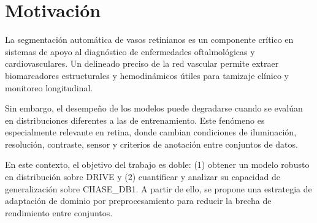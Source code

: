 \section{Motivación}
La segmentación automática de vasos retinianos es un componente crítico en sistemas de apoyo al diagnóstico de enfermedades oftalmológicas y cardiovasculares. Un delineado preciso de la red vascular permite extraer biomarcadores estructurales y hemodinámicos útiles para tamizaje clínico y monitoreo longitudinal.

Sin embargo, el desempeño de los modelos puede degradarse cuando se evalúan en distribuciones diferentes a las de entrenamiento. Este fenómeno es especialmente relevante en retina, donde cambian condiciones de iluminación, resolución, contraste, sensor y criterios de anotación entre conjuntos de datos.

En este contexto, el objetivo del trabajo es doble: (1) obtener un modelo robusto en distribución sobre DRIVE y (2) cuantificar y analizar su capacidad de generalización sobre CHASE\_DB1. A partir de ello, se propone una estrategia de adaptación de dominio por preprocesamiento para reducir la brecha de rendimiento entre conjuntos.
